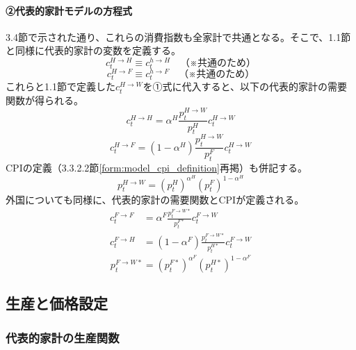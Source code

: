 \paragraph{②代表的家計モデルの方程式}\label{sec:chapter3_final_equations_utility_demand_ra_eq}
3.4節で示された通り、これらの消費指数も全家計で共通となる。そこで、1.1節と同様に代表的家計の変数を定義する。
\begin{equation}
c_t^{H\to H}\equiv c_t^{h\to H}\quad（※共通のため）
\label{form:model_final_equations_utility_ra_h_h_def}
\end{equation}
\begin{equation}
c_t^{H\to F}\equiv c_t^{h\to F}\quad（※共通のため）
\label{form:model_final_equations_utility_ra_h_f_def}
\end{equation}
これらと1.1節で定義した\(c_t^{H\to W}\)を①式に代入すると、以下の代表的家計の需要関数が得られる。
\begin{equation}
c_t^{H\to H}=\alpha^H\frac{p_t^{H\to W}}{p_t^H}c_t^{H\to W}
\label{form:model_final_equations_utility_demand_h_h}
\end{equation}
\begin{equation}
c_t^{H\to F}=(1-\alpha^H)\frac{p_t^{H\to W}}{p_t^F}c_t^{H\to W}
\label{form:model_final_equations_utility_demand_h_f}
\end{equation}
CPIの定義（3.3.2.2節\eqref{form:model_cpi_definition}再掲）も併記する。
\begin{equation}
p_t^{H\to W}=(p_t^H)^{\alpha^H}(p_t^F)^{1-\alpha^H}
\label{form:model_final_equations_utility_cpi_h}
\end{equation}
外国についても同様に、代表的家計の需要関数とCPIが定義される。
\begin{align}
c_t^{F\to F}&=\alpha^F\frac{p_t^{F\to W*}}{p_t^{F*}}c_t^{F\to W} \label{form:model_final_equations_utility_demand_f_f} \\
c_t^{F\to H}&=(1-\alpha^F)\frac{p_t^{F\to W*}}{p_t^{H*}}c_t^{F\to W} \label{form:model_final_equations_utility_demand_f_h}
\end{align}
\begin{equation}
p_t^{F\to W*}=(p_t^{F*})^{\alpha^F}(p_t^{H*})^{1-\alpha^F}
\label{form:model_final_equations_utility_cpi_f}
\end{equation}

\subsection{生産と価格設定}
\label{sec:chapter3_final_equations_pricing}
\subsubsection{代表的家計の生産関数}
\label{sec:chapter3_final_equations_pricing_prod}
